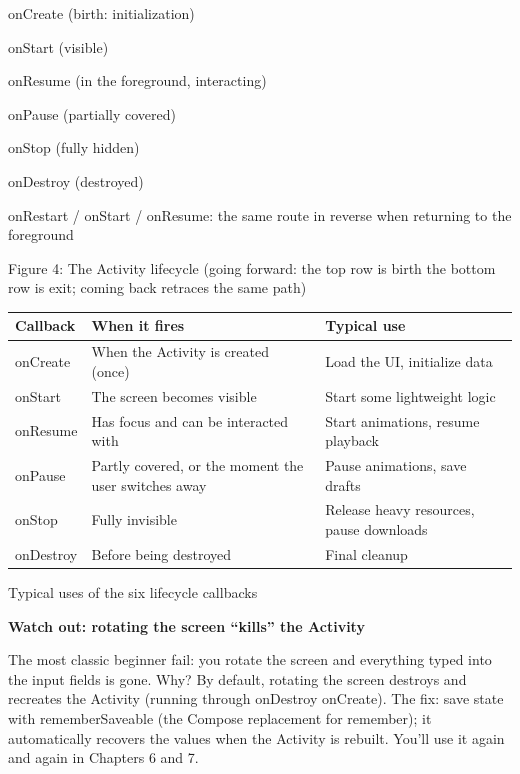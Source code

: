 onCreate (birth: initialization)

onStart (visible)

onResume (in the foreground, interacting)

onPause (partially covered)

onStop (fully hidden)

onDestroy (destroyed)

onRestart / onStart / onResume: the same route in reverse when returning to the foreground

\begin{center}\small\color{gray}Figure 4: The Activity lifecycle (going forward: the top row is birth the bottom row is exit; coming back retraces the same path)\end{center}

\begin{center}
\begin{tabularx}{\linewidth}{|X|X|X|}
\hline
\textbf{Callback} & \textbf{When it fires} & \textbf{Typical use} \tabularnewline
\hline
onCreate & When the Activity is created (once) & Load the UI, initialize data \tabularnewline
onStart & The screen becomes visible & Start some lightweight logic \tabularnewline
onResume & Has focus and can be interacted with & Start animations, resume playback \tabularnewline
onPause & Partly covered, or the moment the user switches away & Pause animations, save drafts \tabularnewline
onStop & Fully invisible & Release heavy resources, pause downloads \tabularnewline
onDestroy & Before being destroyed & Final cleanup \tabularnewline
\hline
\end{tabularx}
\end{center}

\begin{center}\small\color{gray}Typical uses of the six lifecycle callbacks\end{center}

\textbf{Watch out: rotating the screen “kills” the Activity}\par

The most classic beginner fail: you rotate the screen and everything typed into the input fields is gone. Why? By default, rotating the screen destroys and recreates the Activity (running through onDestroy onCreate). The fix: save state with rememberSaveable (the Compose replacement for remember); it automatically recovers the values when the Activity is rebuilt. You'll use it again and again in Chapters 6 and 7.


